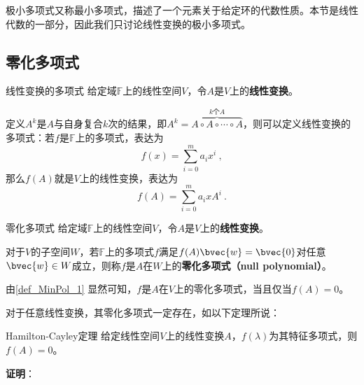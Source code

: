 



极小多项式又称最小多项式，描述了一个元素关于给定环的代数性质。本节是线性代数的一部分，因此我们只讨论线性变换的极小多项式。


\subsection{零化多项式}





\begin{definition}{线性变换的多项式}
给定域$\mathbb{F}$上的线性空间$V$，令$A$是$V$上的\textbf{线性变换}。

定义$A^k$是$A$与自身复合$k$次的结果，即$A^k=\overbrace{A\circ A\circ\cdots\circ A}^{k\text{个}A}$，则可以定义线性变换的多项式：若$f$是$\mathbb{F}$上的多项式，表达为
\begin{equation}
f(x) = \sum_{i=0}^m a_ix^i~, 
\end{equation}
那么$f(A)$就是$V$上的线性变换，表达为
\begin{equation}
f(A) = \sum_{i=0}^m a_ixA^i~. 
\end{equation}
\end{definition}



\begin{definition}{零化多项式}\label{def_MinPol_1}
给定域$\mathbb{F}$上的线性空间$V$，令$A$是$V$上的\textbf{线性变换}。

对于$V$的子空间$W$，若$\mathbb{F}$上的多项式$f$满足$f(A)\bvec{w}=\bvec{0}$对任意$\bvec{w}\in W$成立，则称$f$是$A$在$W$上的\textbf{零化多项式（null polynomial）}。
\end{definition}


由\autoref{def_MinPol_1} 显然可知，$f$是$A$在$V$上的零化多项式，当且仅当$f(A)=0$。


对于任意线性变换，其零化多项式一定存在，如以下定理所说：

\begin{theorem}{Hamilton-Cayley定理}\label{the_MinPol_1}
给定线性空间$V$上的线性变换$A$，$f(\lambda)$为其特征多项式，则$f(A)=0$。
\end{theorem}

\textbf{证明}：

